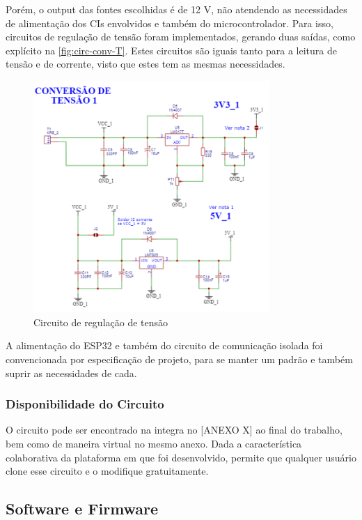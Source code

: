 Porém, o output das fontes escolhidas é de 12 V, não atendendo as necessidades de alimentação dos \gls{CI}s envolvidos e também do microcontrolador. Para isso, circuitos de regulação de tensão foram implementados, gerando duas saídas, como explícito na \autoref{fig:circ-conv-T}. Estes circuitos são iguais tanto para a leitura de tensão e de corrente, visto que estes tem as mesmas necessidades.

\begin{figure}[htb!]
    \caption{Circuito de regulação de tensão}
    \label{fig:circ-conv-T}
    \includegraphics[width=0.8\textwidth]{figuras/circ-conv-T.png}
    \fonte{}
\end{figure}

A alimentação do ESP32 e também do circuito de comunicação isolada foi convencionada por especificação de projeto, para se manter um padrão e também suprir as necessidades de cada.

\subsubsection{Disponibilidade do Circuito}\label{availability}

O circuito pode ser encontrado na integra no [ANEXO X] ao final do trabalho, bem como de maneira virtual no mesmo anexo. Dada a característica colaborativa da plataforma em que foi desenvolvido, permite que qualquer usuário clone esse circuito e o modifique gratuitamente.

\subsection{Software e Firmware}\label{softfirm}

